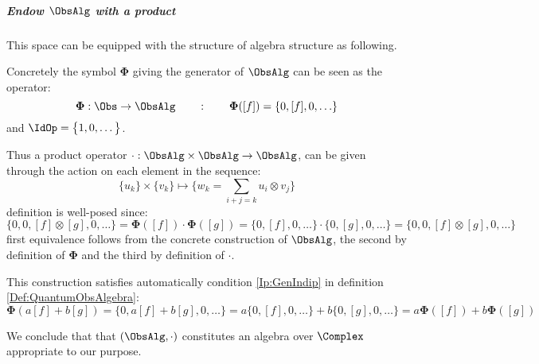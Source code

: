 \documentclass[Main]{subfiles}
\begin{document}
			\subparagraph{Endow $\ObsAlg$ with a product }
				This space can be equipped with the structure of algebra structure as following.
				
				Concretely the symbol $\mathbf{\Phi}$ giving the generator of $\ObsAlg$ can be seen as the operator:
						\begin{displaymath}
							\mathbf{\Phi}: \Obs \rightarrow \ObsAlg \qquad : \qquad \mathbf{\Phi}([f]) = \{ 0, [f], 0,\ldots\}
						\end{displaymath}
						and $\IdOp = \big\{ 1,0,\ldots \big\}$.
				
				Thus a product operator $ \cdot : \ObsAlg \times \ObsAlg \rightarrow \ObsAlg$, can be given through the action on each element in the sequence:
					\begin{displaymath}
						\{ u_k\} \times \{ v_k \} \mapsto \{ w_k = \sum_{i+j=k} u_i \otimes v_j \}
					\end{displaymath}
					definition is well-posed since:
					\begin{displaymath}
						\big\{ 0,0, [f]\otimes [g],0, \ldots \big\} = \mathbf{\Phi}([f]) \cdot \mathbf{\Phi}([g]) =
						\{0,[f],0,\ldots\} \cdot \{ 0,[g],0,\ldots\} = \big\{0,0, [f]\otimes [g],0,\ldots\big\}
					\end{displaymath}
					first equivalence follows from the concrete construction of $\ObsAlg$, the second by definition of $\mathbf{\Phi}$ and the third by definition of $\cdot$.
				
				This construction satisfies automatically condition \ref{Ip:GenIndip} in definition \ref{Def:QuantumObsAlgebra}:
						\begin{displaymath}
							\mathbf{\Phi}(a[f] + b[g]) = \big\{0, a[f] + b[g],0, \ldots \big\}= a\{0, [f],0,\ldots\} + b\{0, [g],0,\ldots \} = a \mathbf{\Phi}([f]) + b \mathbf{\Phi}([g])
						\end{displaymath}

				We conclude that that  $(\ObsAlg, \cdot )$ constitutes an algebra over $\Complex$ appropriate to our purpose.
   				
\end{document}

